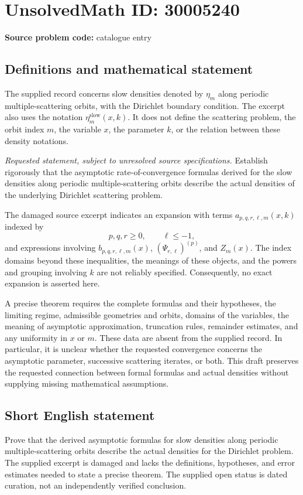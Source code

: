 \documentclass[11pt]{article}
\begin{document}
\section*{UnsolvedMath ID: 30005240}
\textbf{Source problem code:} catalogue entry
\subsection{Definitions and mathematical statement}
The supplied record concerns slow densities denoted by $\eta_m$ along periodic multiple-scattering orbits, with the Dirichlet boundary condition. The excerpt also uses the notation $\eta_m^{\mathrm{slow}}(x,k)$. It does not define the scattering problem, the orbit index $m$, the variable $x$, the parameter $k$, or the relation between these density notations.

\emph{Requested statement, subject to unresolved source specifications.} Establish rigorously that the asymptotic rate-of-convergence formulas derived for the slow densities along periodic multiple-scattering orbits describe the actual densities of the underlying Dirichlet scattering problem.

The damaged source excerpt indicates an expansion with terms $a_{p,q,r,\ell,m}(x,k)$ indexed by
\[
 p,q,r\geq 0,\qquad \ell\leq -1,
\]
and expressions involving $b_{p,q,r,\ell,m}(x)$, $(\Psi_{r,\ell})^{(p)}$, and $Z_m(x)$. The index domains beyond these inequalities, the meanings of these objects, and the powers and grouping involving $k$ are not reliably specified. Consequently, no exact expansion is asserted here.

A precise theorem requires the complete formulas and their hypotheses, the limiting regime, admissible geometries and orbits, domains of the variables, the meaning of asymptotic approximation, truncation rules, remainder estimates, and any uniformity in $x$ or $m$. These data are absent from the supplied record. In particular, it is unclear whether the requested convergence concerns the asymptotic parameter, successive scattering iterates, or both. This draft preserves the requested connection between formal formulas and actual densities without supplying missing mathematical assumptions.
\subsection{Short English statement}
Prove that the derived asymptotic formulas for slow densities along periodic multiple-scattering orbits describe the actual densities for the Dirichlet problem. The supplied excerpt is damaged and lacks the definitions, hypotheses, and error estimates needed to state a precise theorem. The supplied open status is dated curation, not an independently verified conclusion.
\end{document}
